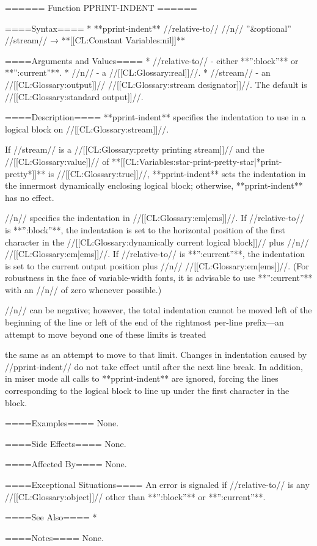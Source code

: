 ====== Function PPRINT-INDENT ======

====Syntax====
  * **pprint-indent** //relative-to// //n// ''&optional'' //stream// → **[[CL:Constant Variables:nil]]**

====Arguments and Values====
  * //relative-to// - either **'':block''** or **'':current''**.
  * //n// - a //[[CL:Glossary:real]]//.
  * //stream// - an //[[CL:Glossary:output]]// //[[CL:Glossary:stream designator]]//. The default is //[[CL:Glossary:standard output]]//.

====Description====
**pprint-indent** specifies the indentation to use in a logical block on //[[CL:Glossary:stream]]//.

If //stream// is a //[[CL:Glossary:pretty printing stream]]// and the //[[CL:Glossary:value]]// of **[[CL:Variables:star-print-pretty-star|*print-pretty*]]** is //[[CL:Glossary:true]]//, **pprint-indent** sets the indentation in the innermost dynamically enclosing logical block; otherwise, **pprint-indent** has no effect.

//n// specifies the indentation in //[[CL:Glossary:em|ems]]//. If //relative-to// is **'':block''**, the indentation is set to the horizontal position of the first character in the //[[CL:Glossary:dynamically current logical block]]// plus //n// //[[CL:Glossary:em|ems]]//. If //relative-to// is **'':current''**, the indentation is set to the current output position plus //n// //[[CL:Glossary:em|ems]]//. (For robustness in the face of variable-width fonts, it is advisable to use **'':current''** with an //n// of zero whenever possible.)

//n// can be negative; however, the total indentation cannot be moved left of the beginning of the line or left of the end of the rightmost per-line prefix---an attempt to move beyond one of these limits is treated

the same as an attempt to move to that limit. Changes in indentation caused by //pprint-indent// do not take effect until after the next line break. In addition, in miser mode all calls to **pprint-indent** are ignored, forcing the lines corresponding to the logical block to line up under the first character in the block.

====Examples====
None.

====Side Effects====
None.

====Affected By====
None.

====Exceptional Situations====
An error is signaled if //relative-to// is any //[[CL:Glossary:object]]// other than **'':block''** or **'':current''**.

====See Also====
  * {\secref\TildeI}

====Notes====
None.

 
